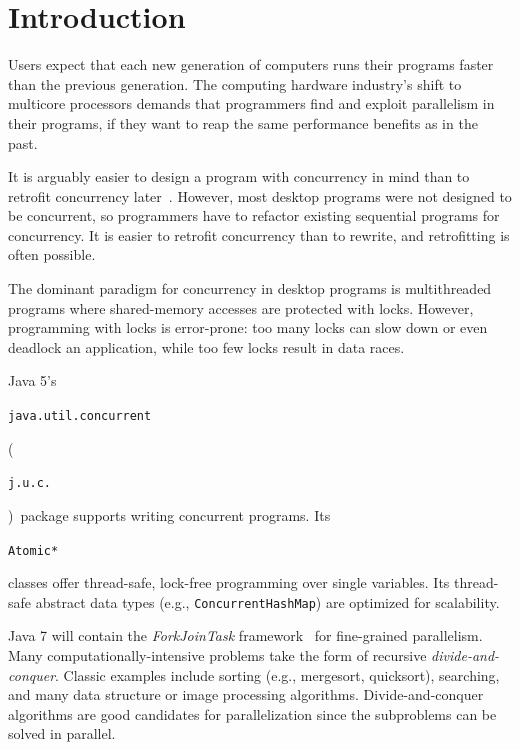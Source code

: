 \documentclass[10pt,twocolumn]{article}
\newcommand\Danny[1]{\nb{Danny}{#1}}
\newcommand{\code}[1]{\begin{smaller}\texttt{#1}\end{smaller}}
\newcommand{\codex}[1]{{\smaller\texttt{#1}}\xspace}
\newcommand{\ConcurrentHashMap}{\codex{Con\-cur\-rent\-Hash\-Map}}
\begin{document}
\section{Introduction}


Users expect that each new generation of computers runs their programs faster than
the previous generation. The computing hardware industry's shift to
multicore processors demands that programmers find and exploit
parallelism in their programs, if they want to reap the same performance
benefits as in the past.

It is arguably easier to design a program with
concurrency in mind than to retrofit concurrency later~\cite{Lea:CPJ99,
Goetz:JCP06}. However, most desktop programs were not designed to be concurrent, so
programmers have to refactor existing sequential programs for concurrency. It
is easier to retrofit concurrency than to rewrite, and retrofitting is often
possible.


The dominant paradigm for concurrency in desktop programs is multithreaded
programs where shared-memory accesses are protected with locks. However,
programming with locks is error-prone: too many locks can slow
down or even deadlock an application, while too few locks result in data races. 


Java 5's \code{java.util.concurrent} (\code{j.u.c.})\ package supports writing
concurrent programs. Its \code{Atomic*} classes offer thread-safe, lock-free programming over 
single variables. Its thread-safe abstract data types (e.g.,
\ConcurrentHashMap) are optimized for scalability. 

Java 7 will contain the \emph{ForkJoinTask} framework~\cite{Lea:jsr166y, DougLea'00:forkJoinFramework} for
fine-grained parallelism. Many computationally-intensive problems take the form of recursive
\emph{divide-and-conquer}. Classic examples include sorting (e.g., mergesort,
quicksort), searching, and many data structure or image processing algorithms.
Divide-and-conquer algorithms are good candidates for parallelization since the
subproblems can be solved in parallel.
\end{document}
